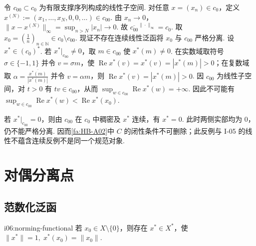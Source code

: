 \begin{FACounterexample}[闭性不可删除]\label{i06:closedness-counterexample}
令 \(\displaystyle c_{00}\subset c_0\) 为有限支撑序列构成的线性子空间. 对任意 \(\displaystyle x=(x_n)\in c_0\)，定义 \(\displaystyle x^{(N)}:=(x_1,\dots,x_N,0,0,\dots)\in c_{00}\).
由 \(\displaystyle x_n\to0\)， \(\displaystyle \|x-x^{(N)}\|_\infty =\sup_{n>N}|x_n| \longrightarrow0\).
故 \(\displaystyle \overline{c_{00}}^{\|\cdot\|_\infty}=c_0\).
取 \(\displaystyle x_0=(\frac{1}{n})_{n\in\mathbb N}\in c_0\setminus c_{00}\).
现证不存在连续线性泛函将 \(\displaystyle x_0\) 与 \(\displaystyle c_{00}\) 严格分离. 设 \(\displaystyle x^*\in(c_0)^*\). 若 \(\displaystyle x^*|_{c_{00}}\neq0\)，取 \(\displaystyle m\in c_{00}\) 使 \(\displaystyle x^*(m)\neq0\). 在实数域取符号 \(\displaystyle \sigma\in\{-1,1\}\) 并令 \(\displaystyle v=\sigma m\)，使 \(\displaystyle \operatorname{Re}x^*(v)=x^*(v)=|x^*(m)|>0\)；在复数域取 \(\displaystyle \alpha=\frac{\overline{x^*(m)}}{|x^*(m)|}\) 并令 \(\displaystyle v=\alpha m\)，则 \(\displaystyle \operatorname{Re}x^*(v)=|x^*(m)|>0\). 因 \(\displaystyle c_{00}\) 为线性子空间，对 \(\displaystyle t>0\) 有 \(\displaystyle tv\in c_{00}\)，从而 \(\displaystyle \sup_{w\in c_{00}}\operatorname{Re}x^*(w)=+\infty\).
因此不可能有 \(\displaystyle \sup_{w\in c_{00}}\operatorname{Re}x^*(w)<\operatorname{Re}x^*(x_0)\).

若 \(\displaystyle x^*|_{c_{00}}=0\)，则由 \(\displaystyle c_{00}\) 在 \(\displaystyle c_0\) 中稠密及 \(\displaystyle x^*\) 连续，有 \(\displaystyle x^*=0\). 此时两侧实部均为 \(\displaystyle0\)，仍不能严格分离. 因而\autoref{fa:HB-A02}中 \(\displaystyle C\) 的闭性条件不可删除；此反例与 I-05 的线性不蕴含连续反例不是同一个规范对象.
\end{FACounterexample}

\section{对偶分离点}\label{sec:i06-dual-separation}

\subsection{范数化泛函}

\begin{FALemma}[B][范数化泛函]{i06:norming-functional}
若 \(\displaystyle x_0\in X\setminus\{0\}\)，则存在 \(\displaystyle x^*\in X^*\)，使 \(\displaystyle \|x^*\|=1, \; x^*(x_0)=\|x_0\|\).
\end{FALemma}

